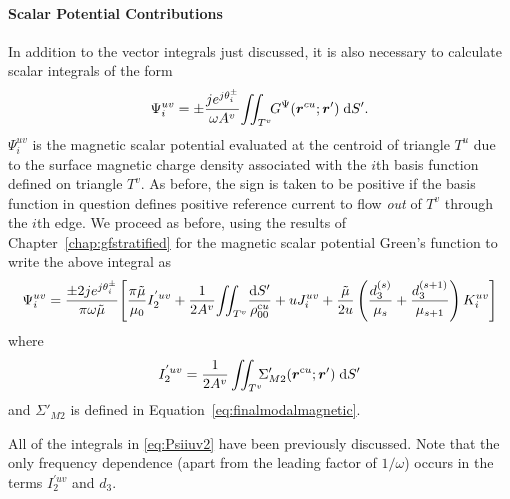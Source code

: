 \paragraph{Scalar Potential Contributions}
In addition to the vector integrals just discussed, it is also 
necessary to calculate scalar integrals of the form
\begin{equation}
  \Psi_i^{uv} = \pm \frac{je^{j\theta^{\pm}_i}}{\omega A^v} \!
  \iint_{T^v} \!\!
  {G}^{\Psi}(\boldsymbol{r}^{cu};\boldsymbol{r}') \; \text{d} S'.  \label{eq:Psiiuv}
\end{equation}
$\Psi_i^{uv}$ is the 
magnetic scalar potential evaluated at the centroid of
triangle $T^u$ due to the surface magnetic charge density associated with
the $i$th basis function defined on triangle $T^v$.  As before, the
sign is taken to be positive if the basis function in question defines
positive reference current to flow {\em out} of $T^v$ through the 
$i$th edge. 
We proceed as before, using the results of Chapter~\ref{chap:gfstratified} for the
magnetic scalar potential Green's function to write the above integral
as 
\begin{equation}
  \Psi_i^{uv} = \frac{\pm 2 j e^{j\theta^{\pm}_i}}{\pi\omega\tilde{\mu}} 
  \Biggl[
  \frac{\pi\tilde{\mu}}{\mu_0}  
  I_{2}^{'uv} + 
  \frac{1}{2A^v}  \! \iint_{T^v}  \!
      \frac{\text{d} S'}{\rho^{\text{c}u}_{00}} +
      u J_i^{uv} +
      \frac{\tilde{\mu}}{2u} 
      \left(
        \frac{d_3^{(s)}}{\mu_s} + \frac{d_3^{(s+1)}}{\mu_{s+1}}
      \right)
      K_i^{uv}
    \Biggr] \label{eq:Psiiuv2}
 \end{equation}
where
\begin{equation}
     I_{2}^{'uv} =
     \frac{1}{2A^v}  \iint_{T^v}  \!\!\!
     \Sigma'_{M2}(\boldsymbol{r}^{\text{c}u};\boldsymbol{r}')
     \; \text{d} S' 
\end{equation}
and $\Sigma'_{M2}$ is defined in Equation~\eqref{eq:finalmodalmagnetic}.

All of the integrals in \eqref{eq:Psiiuv2} have been previously
discussed.  Note that the only frequency dependence (apart from the leading factor of
$1/\omega$) occurs in the terms $I_{2}^{'uv}$ and $d_3$. 

  
